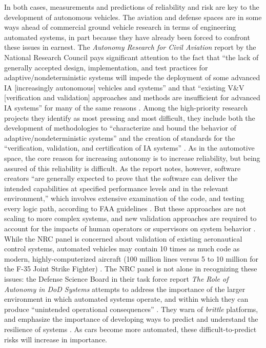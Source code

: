 

In both cases, measurements and predictions of reliability and risk
are key to the development of autonomous vehicles. The aviation and
defense spaces are in some ways ahead of commercial ground vehicle
research in terms of engineering automated systems, in part because
they have already been forced to confront these issues in earnest. The \emph{Autonomy Research for
  Civil Aviation} report by the National Research Council pays
significant attention to the fact that ``the lack of generally
accepted design, implementation, and test practices for
adaptive/nondeterministic systems will impede the deployment of some
advanced IA [increasingly autonomous] vehicles and systems'' and that
``existing V\&V [verification and
  validation] approaches and methods are insufficient for advanced IA
systems'' for many of the same reasons \cite[p. 2]{NRCAutonomy}.
Among the high-priority research projects they identify as
most pressing and most difficult, they include both the development of
methodologies to ``characterize and bound the behavior of
adaptive/nondeterministic systems'' and the creation of standards for
the ``verification, validation, and certification of IA
systems'' \cite[p. 4]{NRCAutonomy}. As in the automotive space, the
core reason for increasing autonomy is to increase reliability, but
being assured of this reliability is difficult. As the report notes,
however, software creators ``are generally expected to prove that the
software can deliver the intended capabilities at specified
performance levels and in the relevant environment,'' which involves
extensive examination of the code, and testing every logic path,
according to FAA guidelines \cite[p. 39--40]{NRCAutonomy}. But
these approaches are not scaling to more complex systems, and new
validation approaches are required to account for the impacts of human
operators or supervisors on system behavior \cite[p.
  40]{NRCAutonomy}. While
the NRC panel is concerned about validation of existing aeronautical
control systems, automated vehicles may contain 10 times as much code
as modern, highly-computerized aircraft (100 million lines versus 5 to
10 million for the F-35 Joint Strike Fighter)
\cite{reutersF35}.
The NRC panel is not alone in recognizing these 
issues: the Defense Science Board in their task force report \emph{The
  Role of Autonomy in DoD Systems} attempts to address the importance
of the larger environment in which automated systems operate, and
within which they can produce ``unintended operational
consequences'' \cite[p. 2]{DSB}. They warn of \emph{brittle}
platforms, and emphasize the importance of developing ways to predict
and understand the resilience of systems \cite[p. 7, 11]{DSB}. As cars
become more automated, these difficult-to-predict risks will increase
in importance.

